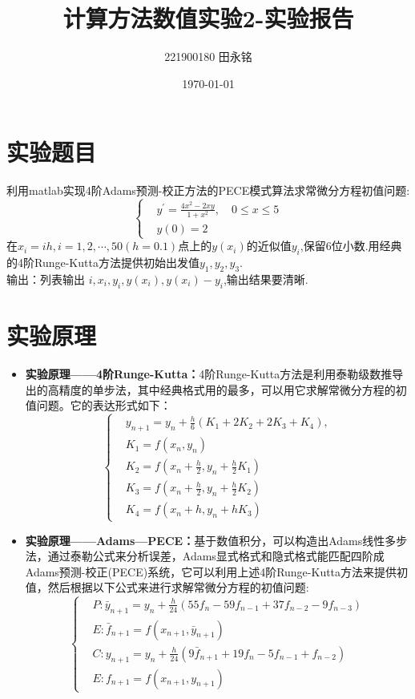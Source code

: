 \documentclass{LabReport}
\title{计算方法数值实验2-实验报告}
\author{221900180 田永铭}
\date{\today}
\begin{document}
	\maketitle
	
	\section{实验题目}
利用matlab实现4阶Adams预测-校正方法的PECE模式算法求常微分方程初值问题:
\[
\left\{
\begin{aligned}
	&y^\prime = \frac{4x^2-2xy}{1+x^2}, \quad 0\leq x\leq5 \\
	&y(0) = 2 
\end{aligned}
\right.
\]
在$x_i = ih,i = 1,2,\cdots,50(h = 0.1)$点上的$y(x_i)$的近似值$y_i$,保留6位小数.用经典的4阶Runge-Kutta方法提供初始出发值$y_1,y_2,y_3$.\\
输出：列表输出 $i,x_i,y_i,y(x_i),y(x_i)-y_i$,输出结果要清晰.

	\section{实验原理}
	\begin{itemize}
		\item \textbf{实验原理——4阶Runge-Kutta：}4阶Runge-Kutta方法是利用泰勒级数推导出的高精度的单步法，其中经典格式用的最多，可以用它求解常微分方程的初值问题。它的表达形式如下：
\[
\left\{
\begin{aligned}
	&y_{n+1}=y_n+\frac{h}{6}(K_1+2K_2+2K_3+K_4),\\
	&K_1 = f(x_n,y_n)\\
	&K_2 = f(x_n+\frac{h}{2},y_n+\frac{h}{2}K_1)\\
	&K_3 = f(x_n+\frac{h}{2},y_n+\frac{h}{2}K_2)\\
	&K_4 = f(x_n+h,y_n+hK_3)
\end{aligned}
\right.
\]
		\item \textbf{实验原理——Adams—PECE：}基于数值积分，可以构造出Adams线性多步法，通过泰勒公式来分析误差，Adams显式格式和隐式格式能匹配四阶成Adams预测-校正(PECE)系统，它可以利用上述4阶Runge-Kutta方法来提供初值，然后根据以下公式来进行求解常微分方程的初值问题:
\[
\left\{
\begin{aligned}
	&P:\bar{y}_{n+1} = y_n + \frac{h}{24}(55f_n - 59f_{n-1} + 37f_{n-2} - 9f_{n-3}) \\
	&E:\bar{f}_{n+1} = f(x_{n+1}, \bar{y}_{n+1}) \\
	&C:y_{n+1} = y_n + \frac{h}{24}(9\bar{f}_{n+1} + 19f_n - 5f_{n-1} + f_{n-2}) \\
	&E:f_{n+1} = f(x_{n+1}, y_{n+1})
\end{aligned}
\right.
\]
	\end{itemize}
	
\end{document}

